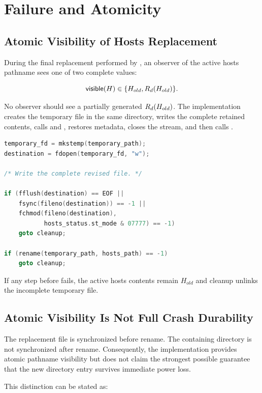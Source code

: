 \section{Failure and Atomicity}

\subsection{Atomic Visibility of Hosts Replacement}

During the final replacement performed by , an observer
of the active hosts pathname sees one of two complete values:

\[
  \mathsf{visible}(H)\in\{H_{old},R_{d}(H_{old})\}.
\]

No observer should see a partially generated $R_{d}(H_{old})$.  The
implementation creates the temporary file in the same directory, writes the
complete retained contents, calls  and , restores
metadata, closes the stream, and then calls .

\begin{lstlisting}[language=C,caption={Core atomic replacement sequence}]
temporary_fd = mkstemp(temporary_path);
destination = fdopen(temporary_fd, "w");

/* Write the complete revised file. */

if (fflush(destination) == EOF ||
    fsync(fileno(destination)) == -1 ||
    fchmod(fileno(destination),
           hosts_status.st_mode & 07777) == -1)
    goto cleanup;

if (rename(temporary_path, hosts_path) == -1)
    goto cleanup;
\end{lstlisting}

If any step before  fails, the active hosts contents remain
$H_{old}$ and cleanup unlinks the incomplete temporary file.

\subsection{Atomic Visibility Is Not Full Crash Durability}

The replacement file is synchronized before rename.  The containing directory
is not synchronized after rename.  Consequently, the implementation provides
atomic pathname visibility but does not claim the strongest possible guarantee
that the new directory entry survives immediate power loss.

This distinction can be stated as:

